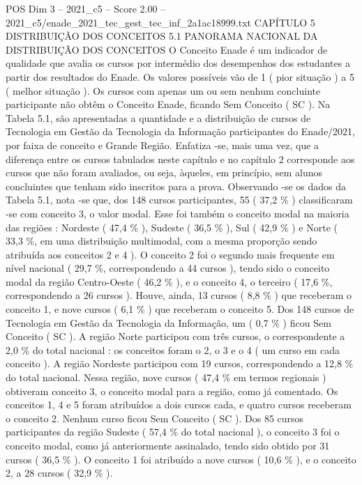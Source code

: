 \begin{textsample}{POS Dim 3 – 2021\_c5 – Score 2.00 – 2021\_c5/enade\_2021\_tec\_gest\_tec\_inf\_2a1ac18999.txt}  \label{ex:f3_pos_089}
CAPÍTULO 5 DISTRIBUIÇÃO DOS CONCEITOS 5.1 PANORAMA NACIONAL DA DISTRIBUIÇÃO DOS CONCEITOS O Conceito Enade é um indicador de qualidade que avalia os cursos por intermédio dos desempenhos dos estudantes a partir dos resultados do Enade.
Os valores possíveis vão de 1 ( pior situação ) a 5 ( melhor situação ).
Os cursos com apenas um ou sem nenhum concluinte participante não obtêm o Conceito Enade, ficando Sem Conceito ( SC ).
Na Tabela 5.1, são apresentadas a quantidade e a distribuição de cursos de Tecnologia em Gestão da Tecnologia da Informação participantes do Enade/2021, por faixa de conceito e Grande Região.
Enfatiza -se, mais uma vez, que a diferença entre os cursos tabulados neste capítulo e no capítulo 2 corresponde aos cursos que não foram avaliados, ou seja, àqueles, em princípio, sem alunos concluintes que tenham sido inscritos para a prova.
Observando -se os dados da Tabela 5.1, nota -se que, dos 148 cursos participantes, 55 ( 37,2 \% ) classificaram -se com conceito 3, o valor modal.
Esse foi também o conceito modal na maioria das regiões : Nordeste ( 47,4 \% ), Sudeste ( 36,5 \% ), Sul ( 42,9 \% ) e Norte ( 33,3 \%, em uma distribuição multimodal, com a mesma proporção sendo atribuída aos conceitos 2 e 4 ).
O conceito 2 foi o segundo mais frequente em nível nacional ( 29,7 \%, correspondendo a 44 cursos ), tendo sido o conceito modal da região Centro-Oeste ( 46,2 \% ), e o conceito 4, o terceiro ( 17,6 \%, correspondendo a 26 cursos ).
Houve, ainda, 13 cursos ( 8,8 \% ) que receberam o conceito 1, e nove cursos ( 6,1 \% ) que receberam o conceito 5.
Dos 148 cursos de Tecnologia em Gestão da Tecnologia da Informação, um ( 0,7 \% ) ficou Sem Conceito ( SC ).
A região Norte participou com três cursos, o correspondente a 2,0 \% do total nacional : os conceitos foram o 2, o 3 e o 4 ( um curso em cada conceito ).
A região Nordeste participou com 19 cursos, correspondendo a 12,8 \% do total nacional.
Nessa região, nove cursos ( 47,4 \% em termos regionais ) obtiveram conceito 3, o conceito modal para a região, como já comentado.
Os conceitos 1, 4 e 5 foram atribuídos a dois cursos cada, e quatro cursos receberam o conceito 2.
Nenhum curso ficou Sem Conceito ( SC ).
Dos 85 cursos participantes da região Sudeste ( 57,4 \% do total nacional ), o conceito 3 foi o conceito modal, como já anteriormente assinalado, tendo sido obtido por 31 cursos ( 36,5 \% ).
O conceito 1 foi atribuído a nove cursos ( 10,6 \% ), e o conceito 2, a 28 cursos ( 32,9 \% ).

\end{textsample}
